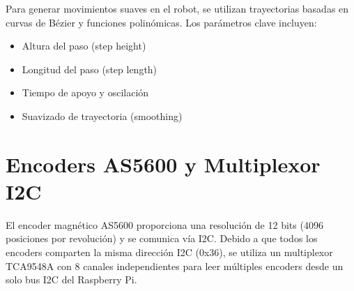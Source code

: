 Para generar movimientos suaves en el robot, se utilizan trayectorias basadas en curvas de Bézier y funciones polinómicas. Los parámetros clave incluyen:

\begin{itemize}
    \item Altura del paso (step height)
    \item Longitud del paso (step length)
    \item Tiempo de apoyo y oscilación
    \item Suavizado de trayectoria (smoothing)
\end{itemize}

\section{Encoders AS5600 y Multiplexor I2C}

El encoder magnético AS5600 proporciona una resolución de 12 bits (4096 posiciones por revolución) y se comunica vía I2C. Debido a que todos los encoders comparten la misma dirección I2C (0x36), se utiliza un multiplexor TCA9548A con 8 canales independientes para leer múltiples encoders desde un solo bus I2C del Raspberry Pi.
